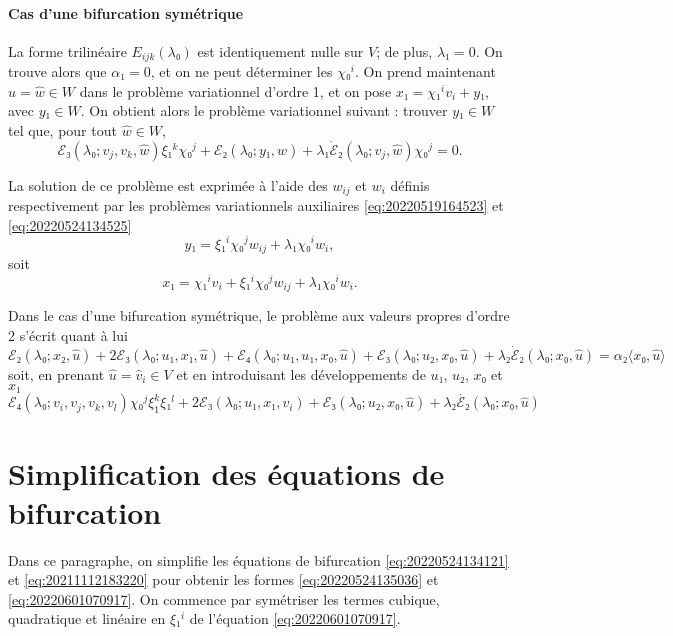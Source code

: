 \documentclass[12pt, final]{amsart}
\theoremstyle{definition}
\begin{document}
\paragraph{Cas d'une bifurcation symétrique} La forme trilinéaire
\(E_{i j k}(λ₀)\) est identiquement nulle sur \(V\); de plus, \(λ₁ = 0\). On
trouve alors que \(α₁ = 0\), et on ne peut déterminer les \(χ₀^i\). On prend
maintenant \(\hat{u} = \hat{w}∈W\) dans le problème variationnel d'ordre 1, et
on pose \(x₁ = χ₁^i v_i + y₁\), avec \(y₁∈W\). On obtient alors le problème
variationnel suivant : trouver \(y₁∈W\) tel que, pour tout \(\hat{w}∈W\),
\begin{equation}
  ℰ₃(λ₀; v_j, v_k, \hat{w}) ξ₁^k χ₀^j + ℰ₂(λ₀; y₁, \hat{w}) + λ₁ \dot{ℰ}₂(λ₀; v_j, \hat{w}) χ₀^j = 0.
\end{equation}

La solution de ce problème est exprimée à l'aide des \(w_{i j}\) et \(w_i\)
définis respectivement par les problèmes variationnels auxiliaires
\eqref{eq:20220519164523} et \eqref{eq:20220524134525}
\begin{equation}
  y₁ = ξ₁^i χ₀^j w_{i j} + λ₁ χ₀^i w_i,
\end{equation}
soit
\begin{equation}
  x₁ = χ₁^i v_i + ξ₁^i χ₀^j w_{i j} + λ₁ χ₀^i w_i.
\end{equation}

Dans le cas d'une bifurcation symétrique, le problème aux valeurs propres d'ordre 2 s'écrit quant à lui
\begin{equation}
  ℰ₂(λ₀; x₂, \hat{u}) + 2ℰ₃(λ₀; u₁, x₁, \hat{u}) +ℰ₄ (λ₀; u₁, u₁, x₀, \hat{u}) + ℰ₃(λ₀; u₂, x₀, \hat{u}) + λ₂ \dot{ℰ}₂(λ₀; x₀, \hat{u}) = α₂ 〈 x₀, \hat{u} 〉
\end{equation}
soit, en prenant \(\hat{u} = \hat{v}_i∈V\) et en introduisant les développements
de \(u₁\), \(u₂\), \(x₀ \) et \(x₁\)
\begin{equation}
  ℰ₄ (λ₀; v_i, v_j, v_k, v_l) χ₀^j ξ_{1}^k ξ₁^l + 2ℰ₃(λ₀; u₁, x₁, v_i) +ℰ₃(λ₀ ; u₂, x₀, \hat{u}) + λ₂ \dot{ℰ₂}(λ₀; x₀, \hat{u})
\end{equation}

\section{Simplification des équations de bifurcation}
\label{sec:20220524134954}

Dans ce paragraphe, on simplifie les équations de bifurcation
\eqref{eq:20220524134121} et \eqref{eq:20211112183220} pour obtenir les formes
\eqref{eq:20220524135036} et \eqref{eq:20220601070917}. On commence par
symétriser les termes cubique, quadratique et linéaire en \(ξ₁^i\) de l'équation
\eqref{eq:20220601070917}.
\end{document}
